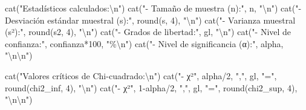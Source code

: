 \documentclass[
  spanish,
  letterpaper,
]{book}
\newenvironment{Shaded}{\begin{snugshade}}{\end{snugshade}}
\newcommand{\DecValTok}[1]{\textcolor[rgb]{0.68,0.00,0.00}{#1}}
\newcommand{\FunctionTok}[1]{\textcolor[rgb]{0.28,0.35,0.67}{#1}}
\newcommand{\NormalTok}[1]{\textcolor[rgb]{0.00,0.23,0.31}{#1}}
\newcommand{\SpecialCharTok}[1]{\textcolor[rgb]{0.37,0.37,0.37}{#1}}
\newcommand{\StringTok}[1]{\textcolor[rgb]{0.13,0.47,0.30}{#1}}
\begin{document}
\begin{Shaded}
\begin{Highlighting}[]
  \FunctionTok{cat}\NormalTok{(}\StringTok{"Estadísticos calculados:}\SpecialCharTok{\textbackslash{}n}\StringTok{"}\NormalTok{)}
  \FunctionTok{cat}\NormalTok{(}\StringTok{"{-} Tamaño de muestra (n):"}\NormalTok{, n, }\StringTok{"}\SpecialCharTok{\textbackslash{}n}\StringTok{"}\NormalTok{)}
  \FunctionTok{cat}\NormalTok{(}\StringTok{"{-} Desviación estándar muestral (s):"}\NormalTok{, }\FunctionTok{round}\NormalTok{(s, }\DecValTok{4}\NormalTok{), }\StringTok{"}\SpecialCharTok{\textbackslash{}n}\StringTok{"}\NormalTok{)}
  \FunctionTok{cat}\NormalTok{(}\StringTok{"{-} Varianza muestral (s²):"}\NormalTok{, }\FunctionTok{round}\NormalTok{(s2, }\DecValTok{4}\NormalTok{), }\StringTok{"}\SpecialCharTok{\textbackslash{}n}\StringTok{"}\NormalTok{)}
  \FunctionTok{cat}\NormalTok{(}\StringTok{"{-} Grados de libertad:"}\NormalTok{, gl, }\StringTok{"}\SpecialCharTok{\textbackslash{}n}\StringTok{"}\NormalTok{)}
  \FunctionTok{cat}\NormalTok{(}\StringTok{"{-} Nivel de confianza:"}\NormalTok{, confianza}\SpecialCharTok{*}\DecValTok{100}\NormalTok{, }\StringTok{"\%}\SpecialCharTok{\textbackslash{}n}\StringTok{"}\NormalTok{)}
  \FunctionTok{cat}\NormalTok{(}\StringTok{"{-} Nivel de significancia (α):"}\NormalTok{, alpha, }\StringTok{"}\SpecialCharTok{\textbackslash{}n\textbackslash{}n}\StringTok{"}\NormalTok{)}
  
  \FunctionTok{cat}\NormalTok{(}\StringTok{"Valores críticos de Chi{-}cuadrado:}\SpecialCharTok{\textbackslash{}n}\StringTok{"}\NormalTok{)}
  \FunctionTok{cat}\NormalTok{(}\StringTok{"{-} χ²"}\NormalTok{, alpha}\SpecialCharTok{/}\DecValTok{2}\NormalTok{, }\StringTok{","}\NormalTok{, gl, }\StringTok{"="}\NormalTok{, }\FunctionTok{round}\NormalTok{(chi2\_inf, }\DecValTok{4}\NormalTok{), }\StringTok{"}\SpecialCharTok{\textbackslash{}n}\StringTok{"}\NormalTok{)}
  \FunctionTok{cat}\NormalTok{(}\StringTok{"{-} χ²"}\NormalTok{, }\DecValTok{1}\SpecialCharTok{{-}}\NormalTok{alpha}\SpecialCharTok{/}\DecValTok{2}\NormalTok{, }\StringTok{","}\NormalTok{, gl, }\StringTok{"="}\NormalTok{, }\FunctionTok{round}\NormalTok{(chi2\_sup, }\DecValTok{4}\NormalTok{), }\StringTok{"}\SpecialCharTok{\textbackslash{}n\textbackslash{}n}\StringTok{"}\NormalTok{)}
  

\end{Highlighting}
\end{Shaded}
\end{document}
